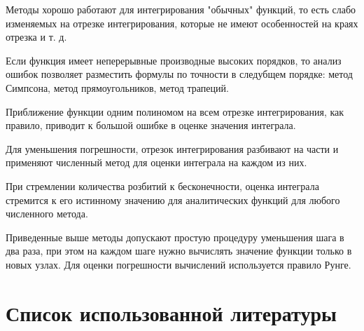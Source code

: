 \documentclass[14pt,a4paper,titlepage]{extarticle}
\begin{document}
Методы хорошо работают для интегрирования "обычных" функций, то есть слабо изменяемых на отрезке интегрирования, которые не имеют особенностей на краях отрезка и т. д.

Если функция имеет неперерывные производные высоких порядков, то анализ ошибок позволяет разместить формулы по точности в следубщем порядке: метод Симпсона, метод прямоугольников, метод трапеций.

Приближение функции одним полиномом на всем отрезке интегрирования, как правило, приводит к большой ошибке в оценке значения интеграла.

Для уменьшения погрешности, отрезок интегрирования разбивают на части и применяют численный метод для оценки интеграла на каждом из них.

При стремлении количества розбитий к бесконечности, оценка интеграла стремится к его истинному значению для аналитических функций для любого численного метода.

Приведенные выше методы допускают простую процедуру уменьшения шага в два раза, при этом на каждом шаге нужно вычислять значение функции только в новых узлах. Для оценки погрешности вычислений используется правило Рунге.

{\centering \section*{Список использованной литературы}}
\end{document}
